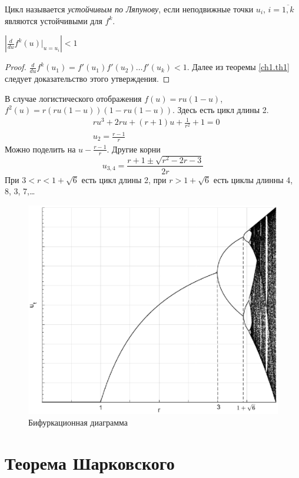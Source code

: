 \begin{definition}
Цикл называется \textit{устойчивым по Ляпунову}, если неподвижные точки $u_i$, $i = \overline{1,k}$ являются устойчивыми для $f^k$.
\end{definition}
\begin{assertion}
 $\left| \frac{d}{du} f^k (u)|_{u = u_i}\right| < 1$
\end{assertion}
\begin{proof}
$\frac{d}{du} f^k (u_1) = f'(u_1) f'(u_2) \ldots f'(u_k) < 1$. Далее из теоремы \ref{ch1.th1} следует доказательство этого утверждения.
\end{proof}

В случае логистического отображения $f(u) = ru(1 - u)$, $f^2 (u) = r(ru(1-u))(1-ru(1-u))$. Здесь есть цикл длины 2.
\begin{equation*}
\begin{aligned}
&ru^3 + 2ru+(r+1)u + \frac{1}{r^2} + 1 = 0\\
&u_2 = \frac{r - 1}{r}
\end{aligned}
\end{equation*}
Можно поделить на $u - \frac{r - 1}{r}$. Другие корни
\begin{equation*}
u_{3,4} = \frac{r+1 \pm \sqrt{r^2 - 2r - 3}}{2r}
\end{equation*}
При $3 < r < 1 + \sqrt{6}$ есть цикл длины 2, при $r > 1 + \sqrt{6}$ есть циклы длинны 4, 8, 3, 7,\ldots

\begin{figure}[H]
\begin{center}
\includegraphics[width=0.5\linewidth]{ch1/ch1_fig8.eps}
\caption{Бифуркационная диаграмма}
\label{ch1.fig8}
\end{center}
\end{figure}

\section{Теорема Шарковского}

